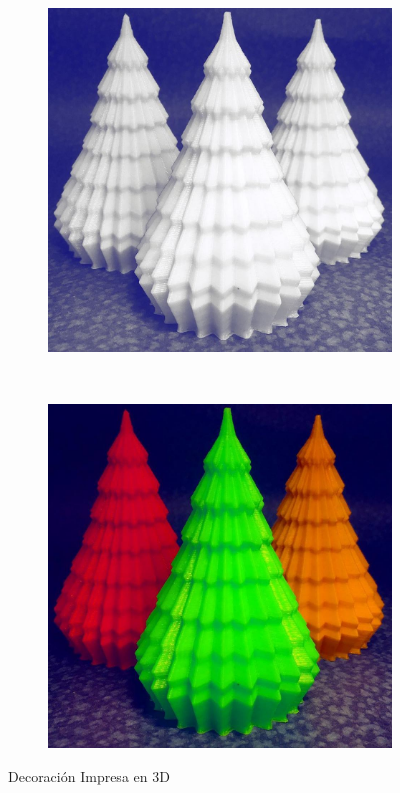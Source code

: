 \documentclass[]{article}
\begin{document}
\begin{figure}[h!]
	\centering
	\begin{subfigure}[b]{0.4\textwidth}
		\includegraphics[width=1\textwidth]{arboles1}
	\end{subfigure}
	~ %
	\begin{subfigure}[b]{0.4\textwidth}	
		\includegraphics[width=1\textwidth]{arboles2}
	\end{subfigure}
	\caption{Decoración Impresa en 3D}
	\label{Fig:decoracionPLA}
\end{figure}
\end{document}
